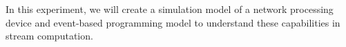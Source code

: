 In this experiment, we will create a simulation model of a network processing device and event-based programming model to understand these capabilities in stream computation.

